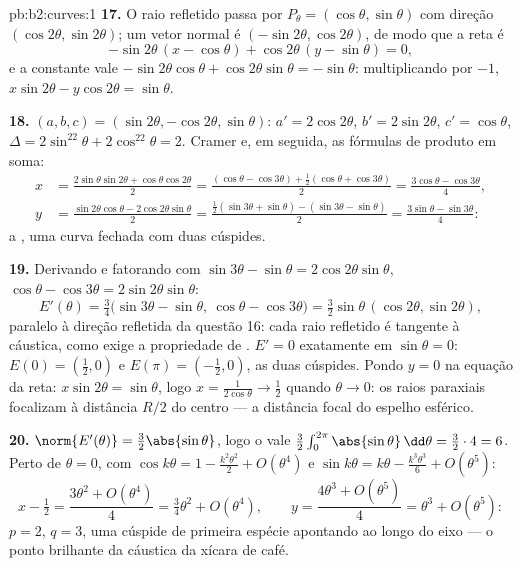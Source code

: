 \begin{solution}{pb:b2:curves:1}
\textbf{17.} O raio refletido passa por $P_\theta =
(\cos\theta, \sin\theta)$ com direção $(\cos2\theta,
\sin2\theta)$; um vetor normal é $(-\sin2\theta,
\cos2\theta)$, de modo que a reta é
\[
-\sin2\theta\,(x - \cos\theta) + \cos2\theta\,(y -
\sin\theta) = 0,
\]
e a constante vale $-\sin2\theta\cos\theta +
\cos2\theta\sin\theta = -\sin\theta$: multiplicando por $-1$,
$x\sin2\theta - y\cos2\theta = \sin\theta$.

\textbf{18.} $(a, b, c) = (\sin2\theta, -\cos2\theta,
\sin\theta)$: $a' = 2\cos2\theta$, $b' = 2\sin2\theta$, $c' =
\cos\theta$, $\Delta = 2\sin^22\theta + 2\cos^22\theta = 2$.
Cramer e, em seguida, as fórmulas de produto em soma:
\begin{align*}
x &= \frac{2\sin\theta\sin2\theta +
\cos\theta\cos2\theta}{2}
= \frac{(\cos\theta - \cos3\theta) + \frac12(\cos\theta +
\cos3\theta)}{2} = \frac{3\cos\theta - \cos3\theta}4,\\
y &= \frac{\sin2\theta\cos\theta - 2\cos2\theta\sin\theta}2
= \frac{\frac12(\sin3\theta + \sin\theta) - (\sin3\theta -
\sin\theta)}2 = \frac{3\sin\theta - \sin3\theta}4 :
\end{align*}
a , uma curva fechada com duas cúspides.

\textbf{19.} Derivando e fatorando com $\sin3\theta
- \sin\theta = 2\cos2\theta\sin\theta$, $\cos\theta -
\cos3\theta = 2\sin2\theta\sin\theta$:
\[
E'(\theta) = \tfrac34\bigl(\sin3\theta - \sin\theta,\
\cos\theta - \cos3\theta\bigr)
= \tfrac32\sin\theta\,(\cos2\theta, \sin2\theta),
\]
paralelo à direção refletida da questão 16: cada
raio refletido é tangente à cáustica, como exige a propriedade
de . $E' = 0$ exatamente em $\sin\theta = 0$:
$E(0) = (\tfrac12, 0)$ e $E(\pi) = (-\tfrac12, 0)$, as duas
cúspides. Pondo $y = 0$ na equação da reta: $x\sin2\theta =
\sin\theta$, logo $x = \frac1{2\cos\theta} \to \frac12$ quando
$\theta \to 0$: os raios paraxiais focalizam à distância $R/2$ do
centro --- a distância focal do espelho esférico.

\textbf{20.} $\norm{E'(\theta)} = \tfrac32\abs{\sin\theta}$,
logo o  vale $\tfrac32\int_0^{2\pi}\abs{\sin\theta}\,
\dd\theta = \tfrac32\cdot4 = 6$. Perto de $\theta = 0$, com
$\cos k\theta = 1 - \tfrac{k^2\theta^2}2 + O(\theta^4)$ e
$\sin k\theta = k\theta - \tfrac{k^3\theta^3}6 +
O(\theta^5)$:
\[
x - \tfrac12 = \frac{3\theta^2 + O(\theta^4)}{4}
= \tfrac34\theta^2 + O(\theta^4),
\qquad
y = \frac{4\theta^3 + O(\theta^5)}{4}
= \theta^3 + O(\theta^5) :
\]
$p = 2$, $q = 3$, uma cúspide de primeira espécie apontando ao longo do
eixo --- o ponto brilhante da cáustica da xícara de café.


\end{solution}
